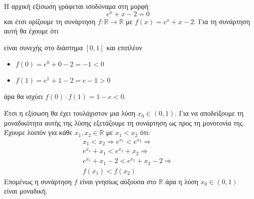 Η αρχική εξίσωση γράφεται ισοδύναμα στη μορφή
\[ e^x+x-2=0 \]
και έτσι ορίζουμε τη συνάρτηση $ f:\mathbb{R}\to\mathbb{R} $ με $ f(x)=e^x+x-2 $. Για τη συνάρτηση αυτή θα έχουμε ότι
\begin{rlist}
\item είναι συνεχής στο διάστημα $ [0,1] $ και επιπλέον
\item \begin{itemize}
\item $ f(0)=e^0+0-2=-1<0 $
\item $ f(1)=e^1+1-2=e-1>0 $
\end{itemize}
άρα θα ισχύει $ f(0)\cdot f(1)=1-e<0 $.
\end{rlist}
Έτσι η εξίσωση θα έχει τουλάχιστον μια λύση $ x_0\in(0,1) $. Για να αποδείξουμε τη μοναδικότητα αυτής της λύσης εξετάζουμε τη συνάρτηση ως προς τη μονοτονία της. Έχουμε λοιπόν για κάθε $ x_1,x_2\in\mathbb{R} $ με $ x_1<x_2 $ ότι:
\begin{gather*}
x_1<x_2\Rightarrow e^{x_1}<e^{x_2}\Rightarrow\\ e^{x_1}+x_1<e^{x_2}+x_2\Rightarrow\\ e^{x_1}+x_1-2<e^{x_2}+x_2-2\Rightarrow\\ f(x_1)<f(x_2)
\end{gather*}
Επομένως η συνάρτηση $ f $ είναι γνησίως αύξουσα στο $ \mathbb{R} $ άρα η λύση $ x_0\in(0,1) $ είναι μοναδική.
